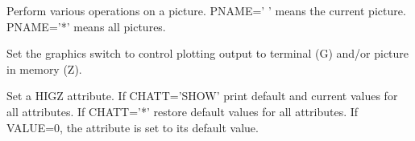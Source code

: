    \par
Perform various operations on a picture.  PNAME=' ' means the current 
   picture.  PNAME='*' means all pictures.  

\ENDCMD


\BEGARG
{}
\ENDARG
{}
\ENDOPT

   \par
Set the graphics switch to control plotting output to terminal (G) and/or 
   picture in memory (Z).  

\ENDCMD


\BEGARG
{}
\ENDARG

   \par
Set a HIGZ attribute.  If CHATT='SHOW' print default and current values for 
   all attributes.  If CHATT='*' restore default values for all attributes.  
   If VALUE=0, the attribute is set to its default value.  

